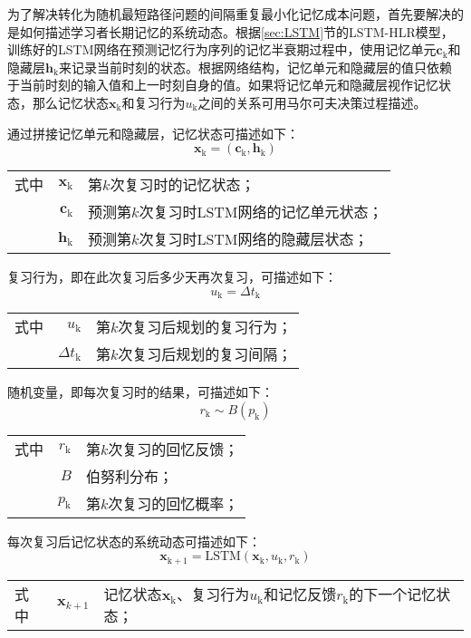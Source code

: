 为了解决转化为随机最短路径问题的间隔重复最小化记忆成本问题，首先要解决的是如何描述学习者长期记忆的系统动态。根据\ref{sec:LSTM}节的LSTM-HLR模型，训练好的LSTM网络在预测记忆行为序列的记忆半衰期过程中，使用记忆单元$\bm c_\mathrm{k}$和隐藏层$\bm h_\mathrm{k}$来记录当前时刻的状态。根据网络结构，记忆单元和隐藏层的值只依赖于当前时刻的输入值和上一时刻自身的值。如果将记忆单元和隐藏层视作记忆状态，那么记忆状态$\bm x_\mathrm{k}$和复习行为$u_\mathrm{k}$之间的关系可用马尔可夫决策过程描述。

通过拼接记忆单元和隐藏层，记忆状态可描述如下：
\begin{equation}
\bm x_\mathrm{k} = (\bm c_\mathrm{k},\bm h_\mathrm{k})
\end{equation}
\begin{tabularx}{\textwidth}{@{}l@{\quad}r@{———}X@{}}
    式中& $\bm x_\mathrm{k}$ &第$k$次复习时的记忆状态；\\
    &  $\bm c_\mathrm{k}$ &预测第$k$次复习时LSTM网络的记忆单元状态；\\
    &  $\bm h_\mathrm{k}$ &预测第$k$次复习时LSTM网络的隐藏层状态；
\end{tabularx}\vspace{3.15bp}

复习行为，即在此次复习后多少天再次复习，可描述如下：
\begin{equation}
u_\mathrm{k}=\Delta t_\mathrm{k}
\end{equation}
\begin{tabularx}{\textwidth}{@{}l@{\quad}r@{———}X@{}}
    式中& $u_\mathrm{k}$ &第$k$次复习后规划的复习行为；\\
    &  $\Delta t_\mathrm{k}$ &第$k$次复习后规划的复习间隔；
\end{tabularx}\vspace{3.15bp}

随机变量，即每次复习时的结果，可描述如下：
\begin{equation}
r_\mathrm{k} \sim B(p_\mathrm{k})
\end{equation}
\begin{tabularx}{\textwidth}{@{}l@{\quad}r@{———}X@{}}
    式中& $r_\mathrm{k}$ &第$k$次复习的回忆反馈；\\
    &  $B$ &伯努利分布；\\
    &  $p_\mathrm{k}$ &第$k$次复习的回忆概率；
\end{tabularx}\vspace{3.15bp}

每次复习后记忆状态的系统动态可描述如下：
\begin{equation}
\bm x_\mathrm{k+1}=\mathrm{LSTM}(\bm x_\mathrm{k},u_\mathrm{k},r_\mathrm{k})
\end{equation}
\begin{tabularx}{\textwidth}{@{}l@{\quad}r@{———}X@{}}
    式中& $\bm x_{k+1}$ &记忆状态$\bm x_\mathrm{k}$、复习行为$u_\mathrm{k}$和记忆反馈$r_\mathrm{k}$的下一个记忆状态；
\end{tabularx}\vspace{3.15bp}

